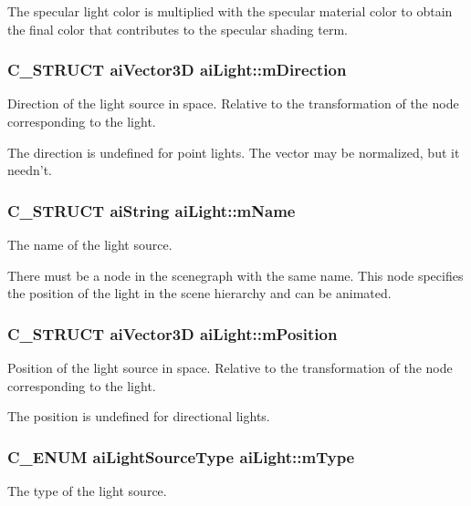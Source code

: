 The specular light color is multiplied with the specular material color to obtain the final color that contributes to the specular shading term. \hypertarget{structai_light_af3776d5e4e6065cb6dd7e10dc656dada}{
\subsubsection[{m\+Direction}]{\setlength{\rightskip}{0pt plus 5cm}C\+\_\+\+S\+T\+R\+U\+C\+T {\bf ai\+Vector3\+D} ai\+Light\+::m\+Direction}}\label{structai_light_af3776d5e4e6065cb6dd7e10dc656dada}
Direction of the light source in space. Relative to the transformation of the node corresponding to the light.

The direction is undefined for point lights. The vector may be normalized, but it needn't. \hypertarget{structai_light_a92806413f16230728b04e5f379fd00c0}{
\subsubsection[{m\+Name}]{\setlength{\rightskip}{0pt plus 5cm}C\+\_\+\+S\+T\+R\+U\+C\+T {\bf ai\+String} ai\+Light\+::m\+Name}}\label{structai_light_a92806413f16230728b04e5f379fd00c0}
The name of the light source.

There must be a node in the scenegraph with the same name. This node specifies the position of the light in the scene hierarchy and can be animated. \hypertarget{structai_light_a5daf9c9ad2613603b847a527123611f0}{
\subsubsection[{m\+Position}]{\setlength{\rightskip}{0pt plus 5cm}C\+\_\+\+S\+T\+R\+U\+C\+T {\bf ai\+Vector3\+D} ai\+Light\+::m\+Position}}\label{structai_light_a5daf9c9ad2613603b847a527123611f0}
Position of the light source in space. Relative to the transformation of the node corresponding to the light.

The position is undefined for directional lights. \hypertarget{structai_light_a4cba1741875dd92724ff55be91c60c2b}{
\subsubsection[{m\+Type}]{\setlength{\rightskip}{0pt plus 5cm}C\+\_\+\+E\+N\+U\+M {\bf ai\+Light\+Source\+Type} ai\+Light\+::m\+Type}}\label{structai_light_a4cba1741875dd92724ff55be91c60c2b}
The type of the light source.


